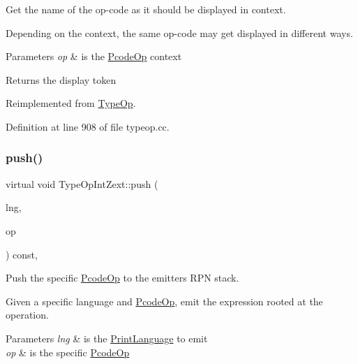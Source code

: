Get the name of the op-\/code as it should be displayed in context. 

Depending on the context, the same op-\/code may get displayed in different ways. 
\begin{DoxyParams}{Parameters}
{\em op} & is the \mbox{\hyperlink{class_pcode_op}{Pcode\+Op}} context \\
\hline
\end{DoxyParams}
\begin{DoxyReturn}{Returns}
the display token 
\end{DoxyReturn}


Reimplemented from \mbox{\hyperlink{class_type_op_a42a1ffa77f998df24efdb44405b33ac5}{Type\+Op}}.



Definition at line 908 of file typeop.\+cc.

\mbox{\label{class_type_op_int_zext_a0b10f9f82e0b78957f8d83339c31626e}} 
\subsubsection{\texorpdfstring{push()}{push()}}
{\footnotesize\ttfamily virtual void Type\+Op\+Int\+Zext\+::push (\begin{DoxyParamCaption}\item[{\mbox{\hyperlink{class_print_language}{Print\+Language}} $\ast$}]{lng,  }\item[{const \mbox{\hyperlink{class_pcode_op}{Pcode\+Op}} $\ast$}]{op }\end{DoxyParamCaption}) const\hspace{0.3cm}{\ttfamily [inline]}, {\ttfamily [virtual]}}



Push the specific \mbox{\hyperlink{class_pcode_op}{Pcode\+Op}} to the emitter\textquotesingle{}s R\+PN stack. 

Given a specific language and \mbox{\hyperlink{class_pcode_op}{Pcode\+Op}}, emit the expression rooted at the operation. 
\begin{DoxyParams}{Parameters}
{\em lng} & is the \mbox{\hyperlink{class_print_language}{Print\+Language}} to emit \\
\hline
{\em op} & is the specific \mbox{\hyperlink{class_pcode_op}{Pcode\+Op}} \\
\hline
\end{DoxyParams}


